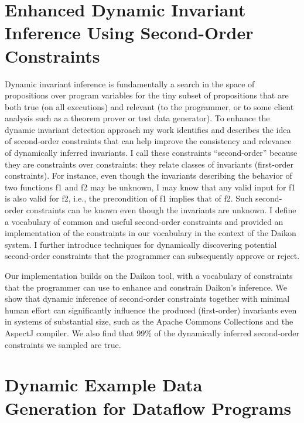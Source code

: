 \documentclass[proposal]{umthesis} %
\begin{document}
\section{Enhanced Dynamic Invariant Inference Using Second-Order Constraints}
Dynamic invariant inference is fundamentally a search in the space of propositions over program variables for the tiny subset of propositions that are both true (on all executions) and relevant (to the programmer, or to some client analysis such as a theorem prover or test data generator). To enhance the dynamic invariant detection approach my work\cite{Li:2013:SCD:2491411.2491457} identifies and describes the idea of second-order constraints that can help improve the consistency and relevance of dynamically inferred invariants.  I call these constraints “second-order” because they are constraints over constraints: they relate classes of invariants (first-order constraints). For instance, even though the invariants describing the behavior of two functions f1 and f2 may be unknown, I may know that any valid input for f1 is also valid for f2, i.e., the precondition of f1 implies that of f2.  Such second-order constraints can be known even though the invariants are unknown.  I define a vocabulary of common and useful second-order constraints and provided an implementation of the constraints in our vocabulary in the context of the Daikon system.  I further introduce techniques for dynamically discovering potential second-order constraints that the programmer can subsequently approve or reject.

Our implementation builds on the Daikon tool, with a vocabulary of constraints that the programmer can use to enhance and constrain Daikon’s inference. We show that dynamic inference of second-order constraints together with minimal human effort can significantly influence the produced (first-order) invariants even in systems of substantial size, such as the Apache Commons Collections and the AspectJ compiler. We also find that 99\% of the dynamically inferred second-order constraints we sampled are true.

\section{Dynamic Example Data Generation for Dataflow Programs}
\end{document}

